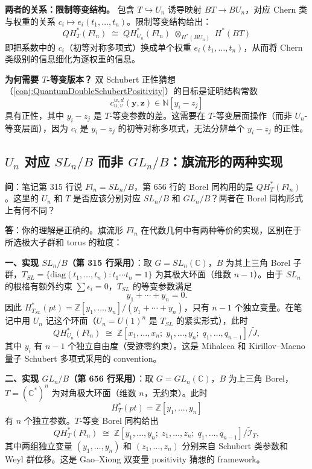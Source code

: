 \textbf{两者的关系：限制等变结构。} 包含 $T \hookrightarrow U_n$ 诱导映射 $BT \to BU_n$，对应 Chern 类与权重的关系 $c_i \mapsto e_i(t_1,\ldots,t_n)$。限制等变结构给出：
$$QH_T^*(Fl_n) \;\cong\; QH_{U_n}^*(Fl_n) \;\otimes_{H^*(BU_n)}\; H^*(BT)$$
即把系数中的 $c_i$（初等对称多项式）换成单个权重 $e_i(t_1,\ldots,t_n)$，从而将 Chern 类级别的信息细化为逐权重的信息。

\textbf{为何需要 $T$-等变版本？} 双 Schubert 正性猜想（\cref{conj:QuantumDoubleSchubertPositivity}）的目标是证明结构常数
$$c_{u,v}^{w,d}(\mathbf{y},\mathbf{z}) \in \mathbb{N}[y_i - z_j]$$
具有正性，其中 $y_i - z_j$ 是 $T$-等变参数的差。这需要在 $T$-等变层面操作（而非 $U_n$-等变层面），因为 $c_i$ 是 $y_i-z_j$ 的初等对称多项式，无法分辨单个 $y_i-z_j$ 的正性。

\subsection{$U_n$ 对应 $SL_n/B$ 而非 $GL_n/B$：旗流形的两种实现}\label{sec:qa-SLn-vs-GLn-FlagVariety}
\textbf{问}：笔记第 315 行说 $Fl_n = SL_n/B$，第 656 行的 Borel 同构用的是 $QH_T^*(Fl_n)$。这里的 $U_n$ 和 $T$ 是否应该分别对应 $SL_n/B$ 和 $GL_n/B$？两者在 Borel 同构形式上有何不同？

\textbf{答}：你的理解是正确的。旗流形 $Fl_n$ 在代数几何中有两种等价的实现，区别在于所选极大子群和 torus 的粒度：

\textbf{一、实现 $SL_n/B$（第 315 行采用）}：取 $G = SL_n(\mathbb{C})$，$B$ 为其上三角 Borel 子群，$T_{SL} = \{ \mathrm{diag}(t_1,\ldots,t_n) : t_1\cdots t_n = 1 \}$ 为其极大环面（维数 $n-1$）。由于 $SL_n$ 的根格有额外约束 $\sum \epsilon_i = 0$，$T_{SL}$ 的等变参数满足
$$y_1 + \cdots + y_n = 0.$$
因此 $H^*_{T_{SL}}(pt) = \mathbb{Z}[y_1,\ldots,y_n] / (y_1+\cdots+y_n)$，只有 $n-1$ 个独立变量。在笔记中用 $U_n$ 记这个环面（$U_n = U(1)^n$ 是 $T_{SL}$ 的紧实形式），此时
$$QH_{U_n}^*(Fl_n) \;\cong\; \mathbb{Z}[x_1,\ldots,x_n;\; y_1,\ldots,y_n;\; q_1,\ldots,q_{n-1}] / \widetilde{J},$$
其中 $y_i$ 有 $n-1$ 个独立自由度（受迹零约束）。这是 Mihalcea 和 Kirillov--Maeno 量子 Schubert 多项式采用的 convention。

\textbf{二、实现 $GL_n/B$（第 656 行采用）}：取 $G = GL_n(\mathbb{C})$，$B$ 为上三角 Borel，$T = (\mathbb{C}^*)^n$ 为对角极大环面（维数 $n$，无约束）。此时
$$H^*_T(pt) = \mathbb{Z}[y_1,\ldots,y_n]$$
有 $n$ 个独立参数。$T$-等变 Borel 同构给出
$$QH_T^*(Fl_n) \;\cong\; \mathbb{Z}[y_1,\ldots,y_n;\; z_1,\ldots,z_n;\; q_1,\ldots,q_{n-1}] / \widetilde{\mathcal{I}}_T,$$
其中两组独立变量 $(y_1,\ldots,y_n)$ 和 $(z_1,\ldots,z_n)$ 分别来自 Schubert 类参数和 Weyl 群位移。这是 Gao--Xiong 双变量 positivity 猜想的 framework。


